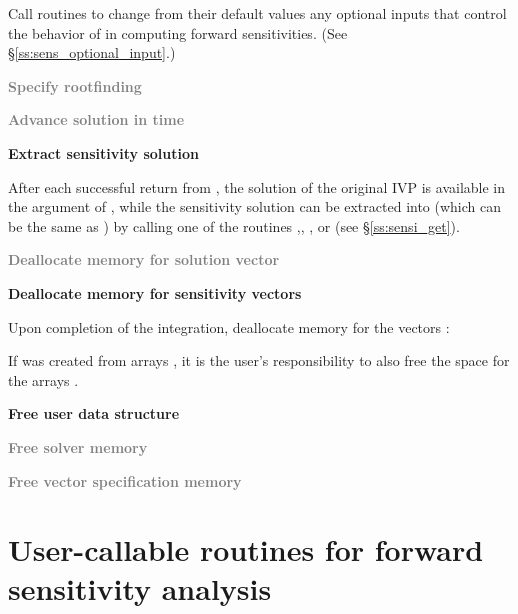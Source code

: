 \begin{Steps}
  Call  routines to change from their default values any
  optional inputs that control the behavior of {\cvodes} in computing forward 
  sensitivities.  (See \S\ref{ss:sens_optional_input}.)

\item
  \textcolor{gray}{\bf Specify rootfinding}

\item
  \textcolor{gray}{\bf Advance solution in time}

\item
  {\bf Extract sensitivity solution}

  After each successful return from , the solution of the
  original IVP is available in the  argument of ,
  while the sensitivity solution can be extracted into  (which can 
  be the same as ) by calling one of the routines 
  ,, , or 
  (see \S\ref{ss:sensi_get}).

\item
  \textcolor{gray}{\bf Deallocate memory for solution vector}

\item 
  {\bf Deallocate memory for sensitivity vectors}

  Upon completion of the integration, deallocate memory for the vectors :

  {\s} 

  {\p} 

  If  was created from  arrays , it is the
  user's responsibility to also free the space for the arrays .

\item
  {\bf Free user data structure}

\item
  \textcolor{gray}{\bf Free solver memory}
  
\item
  \textcolor{gray}{\bf Free vector specification memory}

\end{Steps}

\section{User-callable routines for forward sensitivity analysis}

